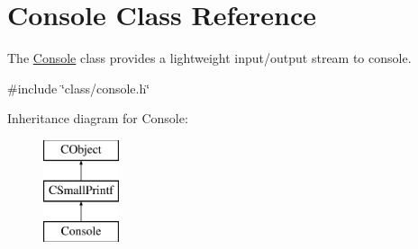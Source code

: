 \hypertarget{class_console}{\section{Console Class Reference}
\label{class_console}
}


The \hyperlink{class_console}{Console} class provides a lightweight input/output stream to console.  




{\ttfamily \#include \char`\"{}class/console.\-h\char`\"{}}

Inheritance diagram for Console\-:\begin{figure}[H]
\begin{center}
\leavevmode
\includegraphics[height=3.000000cm]{d6/d56/class_console}
\end{center}
\end{figure}
